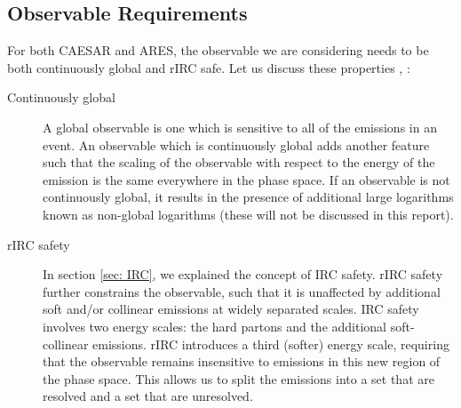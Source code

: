 \subsection{Observable Requirements}
For both CAESAR and ARES, the observable we are considering needs to be both continuously global and rIRC safe. Let us discuss these properties \cite{McAslan:2017bqp}, \cite{Arpino:2020smn}:
\begin{description}
   \item[Continuously global] A global observable is one which is sensitive to all of the emissions in an event. An observable which is continuously global adds another feature such that the scaling of the observable with respect to the energy of the emission is the same everywhere in the phase space. If an observable is not continuously global, it results in the presence of additional large logarithms known as non-global logarithms (these will not be discussed in this report).
 \item[rIRC safety] In section \ref{sec: IRC}, we explained the concept of IRC safety. rIRC safety further constrains the observable, such that it is unaffected by additional soft and/or collinear emissions at widely separated scales. IRC safety involves two energy scales: the hard partons and the additional soft-collinear emissions. rIRC introduces a third (softer) energy scale, requiring that the observable remains insensitive to emissions in this new region of the phase space. This allows us to split the emissions into a set that are resolved and a set that are unresolved. 
 
\end{description}

